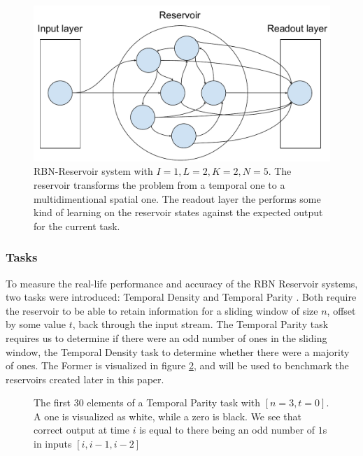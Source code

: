 \begin{figure}
  \centering
  \includegraphics[width=\columnwidth]{background/RBN-Reservoir.pdf}
  \caption{
    RBN-Reservoir system with $I=1, L=2, K=2, N=5$.
    The reservoir transforms the problem from a temporal one to a multidimentional spatial one.
    The readout layer the performs some kind of learning on the reservoir states against the expected output for the current task.}
  \label{figure:rbn-reservoir}
\end{figure}

\subsubsection{Tasks}
\label{section:tasks}

To measure the real-life performance and accuracy of the RBN Reservoir systems,
two tasks were introduced: Temporal Density and Temporal Parity \cite{rbn-reservoir}.
Both require the reservoir to be able to retain information for a sliding window of size $ n $,
offset by some value $ t $, back through the input stream.
The Temporal Parity task requires us to determine if there were an odd number of ones in the sliding window,
the Temporal Density task to determine whether there were a majority of ones.
The Former is visualized in figure \ref{figure:temporal-parity},
and will be used to benchmark the reservoirs created later in this paper.

\begin{figure}


  \caption{
    The first 30 elements of a Temporal Parity task with $[n=3, t=0]$.
    A one is visualized as white, while a zero is black.
    We see that correct output at time $i$ is equal to there being an odd number of $1$s in inputs $[i, i-1, i-2]$
  }
  \label{figure:temporal-parity}
\end{figure}

